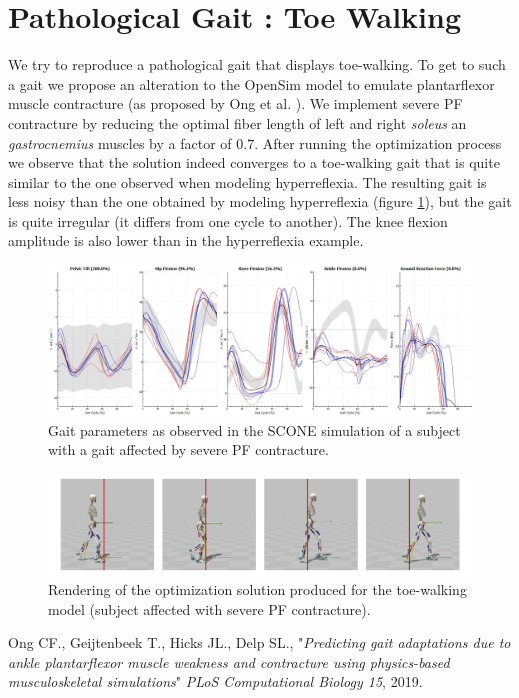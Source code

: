 \documentclass[11pt]{article}
\begin{document}
\section{Pathological Gait : Toe Walking}

We try to reproduce a pathological gait that displays toe-walking. To get to such a gait we propose an alteration to the OpenSim model to emulate plantarflexor muscle contracture (as proposed by Ong et al. \cite{1}). We implement severe PF contracture by reducing the optimal fiber length of left and right \textit{soleus} an \textit{gastrocnemius} muscles by a factor of $0.7$. After running the optimization process we observe that the solution indeed converges to a toe-walking gait that is quite similar to the one observed when modeling hyperreflexia. The resulting gait is less noisy than the one obtained by modeling hyperreflexia (figure \ref{toe_gait}), but the gait is quite irregular (it differs from one cycle to another). The knee flexion amplitude is also lower than in the hyperreflexia example.

\begin{figure}[h!]
    \centering
    \includegraphics[width=\textwidth]{screens/toe_walk_gait.png}
    \caption{Gait parameters as observed in the SCONE simulation of a subject with a gait affected by severe PF contracture.}
    \label{toe_gait}
\end{figure}

\begin{figure}[h!]
    \centering
    \includegraphics[width=\textwidth]{screens/toe_render.jpg}
    \caption{Rendering of the optimization solution produced for the toe-walking model (subject affected with severe PF contracture).}
    \label{toe_render}
\end{figure}


\begin{thebibliography}{1}

     Ong CF., Geijtenbeek T., Hicks JL., Delp SL., "\textit{Predicting gait adaptations due to ankle plantarflexor muscle weakness and contracture using physics-based musculoskeletal simulations}" \emph{PLoS Computational Biology 15}, 2019.
\end{thebibliography}
\end{document}
